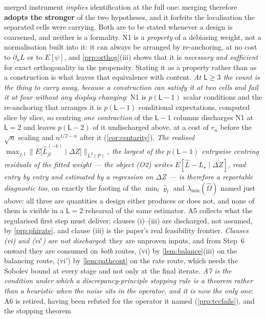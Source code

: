 merged instrument \emph{implies} identification at the full one: merging therefore \textbf{adopts the
stronger} of the two hypotheses, and it forfeits the localisation the separated cells were carrying.
Both are to be stated whenever a design is coarsened, and neither is a formality. N1 is a \emph{property} of a debiasing weight, not a normalisation built
into it: it can always be arranged by re-anchoring, at no cost to $\partial_uL$ or to $E[\psi]$, and
\cref{prp:orthog}(iii) shows that it is \emph{necessary and sufficient} for exact orthogonality in the
propensity. Stating it as a property rather than as a construction is what leaves that equivalence with
content. \emph{At $\mathsf L\ge3$ the count is the thing to carry away, because a construction can
satisfy it at two cells and fail it at four without any display changing}: N1 is
$p(\mathsf L-1)$ scalar conditions and the re-anchoring that arranges it is $p(\mathsf L-1)$
conditional expectations, computed slice by slice, so centring \emph{one contraction} of the
$\mathsf L-1$ columns discharges N1 at $\mathsf L=2$ and leaves $p(\mathsf L-2)$ of it undischarged
above, at a cost of $r_n$ before the $\sqrt n$ scaling and $n^{1/2-\alpha}$ after it
(\cref{cor:centarity}). \emph{The realised
$\max_{j,l}\big\|E\big[\hat L^{(-k)}_{jl}\mid\Delta Z\big]\big\|_{L^{2}(P)}$, the largest of the
$p(\mathsf L-1)$ entrywise centring residuals of the fitted weight --- the object \textup{(O2)} writes
$E[\hat L-L_\star\mid\Delta Z]$, read entry by entry and estimated by a regression on $\Delta Z$ ---
is therefore a reportable diagnostic too}, on exactly the footing of the $\min_l\hat\varrho_l$ and
$\lambda_{\min}(\hat\Omega)$ named just above: all three are quantities a design either produces or
does not, and none of them is visible in a $\mathsf L=2$ rehearsal of the same estimator. A5 collects what the regularised first step must deliver; clauses (i)--(iii) are
discharged, not assumed, by \cref{prp:phirate}, and clause (iii) is the paper's real feasibility
frontier. \emph{Clauses (vi) and (vi$'$) are not discharged}: they are unproven inputs, and from Step~6
onward they are consumed on \emph{both} routes, (vi) by \cref{lem:balance}(iii) on the balancing
route, (vi$'$) by \cref{lem:pathcont} on the rate route, which needs the Sobolev bound at every stage
and not only at the final iterate.
\emph{A7 is the condition under which a discrepancy-principle stopping rule is a theorem rather than a
heuristic when the noise sits in the operator, and it is now the only one}: A6 is retired, having been
refuted for the operator it named (\cref{prp:tccfails}), and the stopping theorem

